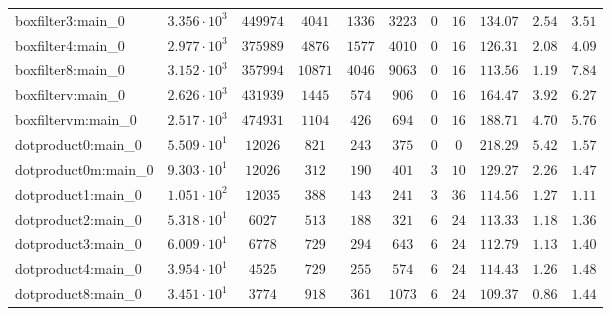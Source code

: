 \begin{tabular}{|l|c|c|c|c|c|c|c|c|c|c|}
boxfilter3:main\_0             & $ 3.356 \cdot 10^{3} $ & $ 449974   $ & $ 4041   $ & $ 1336   $ & $ 3223   $ & $ 0    $ & $ 16   $ & $ 134.07      $ & $ 2.54    $ & $ 3.51    $ \\
boxfilter4:main\_0             & $ 2.977 \cdot 10^{3} $ & $ 375989   $ & $ 4876   $ & $ 1577   $ & $ 4010   $ & $ 0    $ & $ 16   $ & $ 126.31      $ & $ 2.08    $ & $ 4.09    $ \\
boxfilter8:main\_0             & $ 3.152 \cdot 10^{3} $ & $ 357994   $ & $ 10871  $ & $ 4046   $ & $ 9063   $ & $ 0    $ & $ 16   $ & $ 113.56      $ & $ 1.19    $ & $ 7.84    $ \\
boxfilterv:main\_0             & $ 2.626 \cdot 10^{3} $ & $ 431939   $ & $ 1445   $ & $ 574    $ & $ 906    $ & $ 0    $ & $ 16   $ & $ 164.47      $ & $ 3.92    $ & $ 6.27    $ \\
boxfiltervm:main\_0            & $ 2.517 \cdot 10^{3} $ & $ 474931   $ & $ 1104   $ & $ 426    $ & $ 694    $ & $ 0    $ & $ 16   $ & $ 188.71      $ & $ 4.70    $ & $ 5.76    $ \\
dotproduct0:main\_0            & $ 5.509 \cdot 10^{1} $ & $ 12026    $ & $ 821    $ & $ 243    $ & $ 375    $ & $ 0    $ & $ 0    $ & $ 218.29      $ & $ 5.42    $ & $ 1.57    $ \\
dotproduct0m:main\_0           & $ 9.303 \cdot 10^{1} $ & $ 12026    $ & $ 312    $ & $ 190    $ & $ 401    $ & $ 3    $ & $ 10   $ & $ 129.27      $ & $ 2.26    $ & $ 1.47    $ \\
dotproduct1:main\_0            & $ 1.051 \cdot 10^{2} $ & $ 12035    $ & $ 388    $ & $ 143    $ & $ 241    $ & $ 3    $ & $ 36   $ & $ 114.56      $ & $ 1.27    $ & $ 1.11    $ \\
dotproduct2:main\_0            & $ 5.318 \cdot 10^{1} $ & $ 6027     $ & $ 513    $ & $ 188    $ & $ 321    $ & $ 6    $ & $ 24   $ & $ 113.33      $ & $ 1.18    $ & $ 1.36    $ \\
dotproduct3:main\_0            & $ 6.009 \cdot 10^{1} $ & $ 6778     $ & $ 729    $ & $ 294    $ & $ 643    $ & $ 6    $ & $ 24   $ & $ 112.79      $ & $ 1.13    $ & $ 1.40    $ \\
dotproduct4:main\_0            & $ 3.954 \cdot 10^{1} $ & $ 4525     $ & $ 729    $ & $ 255    $ & $ 574    $ & $ 6    $ & $ 24   $ & $ 114.43      $ & $ 1.26    $ & $ 1.48    $ \\
dotproduct8:main\_0            & $ 3.451 \cdot 10^{1} $ & $ 3774     $ & $ 918    $ & $ 361    $ & $ 1073   $ & $ 6    $ & $ 24   $ & $ 109.37      $ & $ 0.86    $ & $ 1.44    $ \\

\end{tabular}
